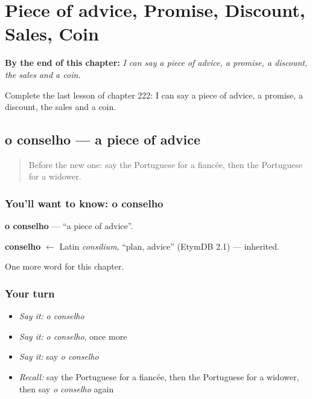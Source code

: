 
\chapter{Piece of advice, Promise, Discount, Sales, Coin}
\label{ch:pt-piece-of-advice-promise-discount-sales-coin}

\begin{chapteropening}
\textbf{By the end of this chapter:} \emph{I can say a piece of advice, a promise, a discount, the sales and a coin.}

Complete the last lesson of chapter 222: I can say a piece of advice, a promise, a discount, the sales and a coin.
\end{chapteropening}

\section[o conselho]{o conselho — a piece of advice}

\label{lesson:PT-C222-conselho}



\begin{quote}
Before the new one: say the Portuguese for a fiancée, then the Portuguese for a widower.
\end{quote}

\subsection*{You'll want to know: o conselho}
\textbf{o conselho} — \textquotedblleft{}a piece of advice\textquotedblright{}.

\begin{cousinweb}
\textbf{conselho} $\leftarrow$ Latin \emph{consilium}, \textquotedblleft{}plan, advice\textquotedblright{} (EtymDB 2.1) — inherited.
\end{cousinweb}

\begin{grammarlens}[title={What you've built}]
One more word for this chapter.
\end{grammarlens}

\subsection*{Your turn}
\begin{itemize}
\raggedright
  \item \emph{Say it:} \emph{o conselho}
  \item \emph{Say it:} \emph{o conselho}, once more
  \item \emph{Say it:} say \emph{o conselho}
  \item \emph{Recall:} say the Portuguese for a fiancée, then the Portuguese for a widower, then say \emph{o conselho} again
\end{itemize}

